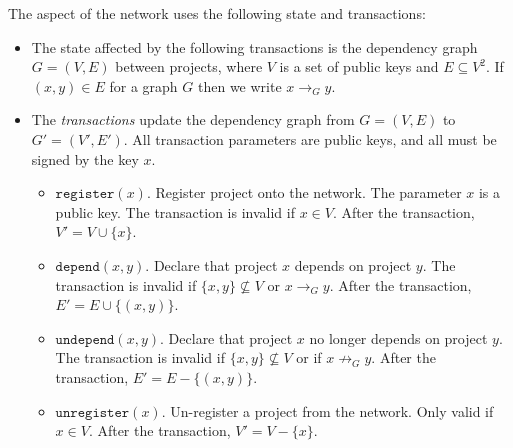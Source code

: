 The \srcrank{} aspect of the network uses the following state and transactions:
\begin{itemize}
\item The state affected by the following transactions is the
  dependency graph $G = (V,E)$ between projects, where $V$ is a set of
  public keys and $E \subseteq V^2$. If $(x,y) \in E$ for a graph $G$
  then we write $x \to_G y$.
\item The \emph{transactions} update the dependency graph from $G =
  (V,E)$ to $G' = (V', E')$. All transaction parameters are public
  keys, and all must be signed by the key $x$.
  \begin{itemize}
  \item $\mathtt{register}(x)$. Register project onto the network. The
    parameter $x$ is a public key. The transaction is invalid if $x
    \in V$. After the transaction, $V' = V \cup \{x\}$.
  \item $\mathtt{depend}(x,y)$. Declare that project $x$ depends on
    project $y$. The transaction is invalid if $\{x,y\} \nsubseteq V$
    or $x \to_G y$. After the transaction, $E' = E \cup \{(x,y)\}$.
  \item $\mathtt{undepend}(x,y)$. Declare that project $x$ no longer
    depends on project $y$. The transaction is invalid if $\{x,y\}
    \nsubseteq V$ or if $x \not \to_G y$. After the transaction, $E' =
    E - \{(x,y)\}$.
  \item $\mathtt{unregister}(x)$. Un-register a project from the
    network. Only valid if $x \in V$. After the transaction, $V' = V -
    \{x\}$.
  \end{itemize}
\end{itemize}
